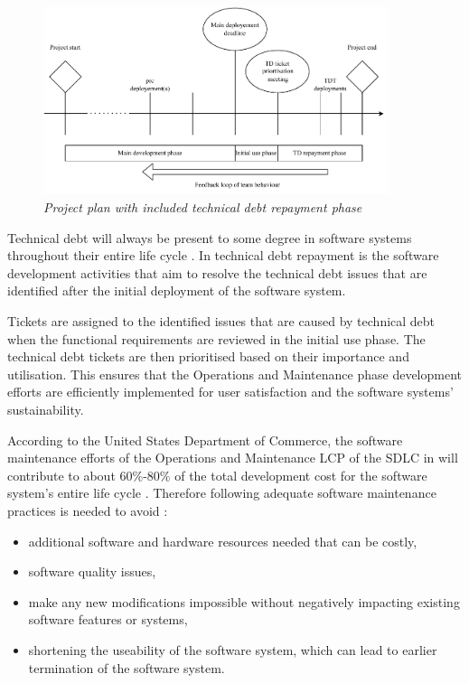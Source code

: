 \clearpage

\begin{figure}[!htb]
	\centering %
	\includegraphics[width=0.9\textwidth]{img/Chapter1/TD_repayment/TD_repayment.pdf}
	\caption[Project plan with included technical debt repayment phase]
	{\textit{Project plan with included technical debt repayment phase \cite{Wiese2021}}}\label{fig:ch1_tdRepayment}
\end{figure} 

Technical debt will always be present to some degree in software systems throughout their entire life cycle \cite{Wiese2021}. In  technical debt repayment is the software development activities that aim to resolve the technical debt issues that are identified after the initial deployment of the software system.\par Tickets are assigned to the identified issues that are caused by technical debt when the functional requirements are reviewed in the initial use phase. The technical debt tickets are then prioritised based on their importance and utilisation. This ensures that the Operations and Maintenance phase development efforts are efficiently implemented for user satisfaction and the software systems' sustainability. \par According to the United States Department of Commerce, the software maintenance efforts of the Operations and Maintenance LCP of the SDLC in  will contribute to about $60\%$-$80\%$ of the total development cost for the software system's entire life cycle \cite{Ogheneovo2014, Ackermann2009, Tang2010}. Therefore following adequate software maintenance practices is needed to avoid \cite{DeLeon-Sigg2020}:

\begin{itemize}
	\item additional software and hardware resources needed that can be costly,
	\item software quality issues,
	\item make any new modifications impossible without negatively impacting existing software features or systems,
	\item shortening the useability of the software system, which can lead to earlier termination of the software system.
\end{itemize}

